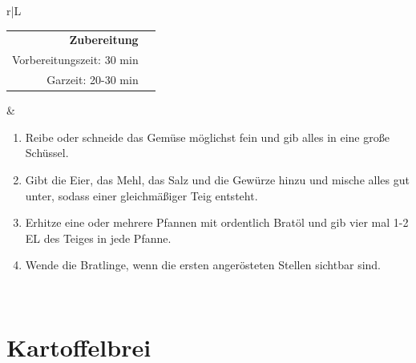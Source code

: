 \documentclass[a4paper, 12pt]{scrbook} 								%
\numberwithin{equation}{section} 									%
\begin{document}
	\begin{tabularx}{\textwidth}{r|L}
		\begin{tabular}[t]{rr}
			\textbf{Zubereitung}	\\
			Vorbereitungszeit: 30 min	\\
			Garzeit: 20-30 min		\\
		\end{tabular}			&	\begin{enumerate}[]
										\item Reibe oder schneide das Gemüse möglichst fein und gib alles in eine große Schüssel.
										\item Gibt die Eier, das Mehl, das Salz und die Gewürze hinzu und mische alles gut unter, sodass einer gleichmäßiger Teig entsteht.
										\item Erhitze eine oder mehrere Pfannen mit ordentlich Bratöl und gib vier mal 1-2 EL des Teiges in jede Pfanne.
										\item Wende die Bratlinge, wenn die ersten angerösteten Stellen sichtbar sind.
									\end{enumerate}	\\
	\end{tabularx}
	\newpage

	\section{Kartoffelbrei}	\label{kartoffelbrei}
\end{document}
